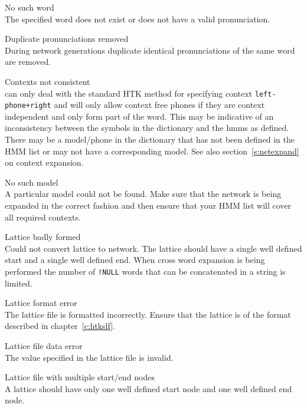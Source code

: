 \begin{itemize}

\begin{itemize}
    No such word\\
        The specified word does not exist or does not have a valid 
        pronunciation.

    Duplicate pronunciations removed\\
        During network generations duplicate identical pronunciations
        of the same word are removed.

    Contexts not consistent\\
         can only deal with the standard HTK method for specifying
        context \texttt{left-phone+right} and will only allow context free 
        phones if they are context independent and only form part of the word.
        This may be indicative of an inconsistency between the symbols in the dictionary
        and the hmms as defined. There may be a model/phone in the dictionary that has 
        not been defined in the HMM list or may not have a corresponding model.
        See also section~\ref{s:netexpand}  on context expansion.


    No such model\\
        A particular model could not be found.  Make sure that the network is
        being expanded in the correct fashion and then ensure that your HMM
        list will cover all required contexts.

    Lattice badly formed\\
        Could not convert lattice to network.  The lattice should have a single
        well defined start and a single well defined end.  When cross word 
        expansion is being performed the number of \texttt{!NULL} words that 
        can be concatenated in a string is limited.

    Lattice format error\\
        The lattice file is formatted incorrectly.  Ensure that the lattice
        is of the format described in chapter~\ref{c:htkslf}.

    Lattice file data error\\
        The value specified in the lattice file is invalid.

    Lattice file with multiple start/end nodes\\
        A lattice should have only one well defined start node and one
        well defined end node.


\end{itemize}
\end{itemize}
